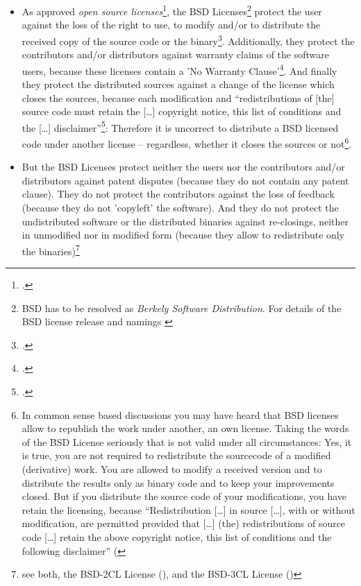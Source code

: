 \begin{itemize}
  \item As approved \emph{open source licenses}\footcite[cf.][\nopage
  wp]{OSI2012b}, the BSD Licenses\footnote{BSD has to be resolved as
  \emph{Berkely Software Distribution}. For details of the BSD license release
  and namings \cite[cf.][\nopage wp.\ editorial]{BsdLicense3Clause}} protect the
  user against the loss of the right to use, to modify and/or to distribute the
  received copy of the source code or the binary\footcite[cf.][\nopage wp
  §1ff]{OSI2012a}. Additionally, they protect the contributors and/or
  distributors against warranty claims of the software users, because these
  licenses contain a 'No Warranty Clause'\footcite[one for all version
  cf.][\nopage wp]{BsdLicense2Clause}. And finally they protect the distributed
  sources against a change of the license which closes the sources, because each
  modification and \enquote{redistributions of [the] source code must retain the
  [\ldots] copyright notice, this list of conditions and the [\ldots]
  disclaimer}\footcite[cf.][\nopage wp]{BsdLicense2Clause}: Therefore it is
  uncorrect to distribute a BSD licensed code under another license -- regardless,
  whether it closes the sources or not\footnote{In common sense based discussions
  you may have heard that BSD licenses allow to republish the work under
  another, an own license. Taking the words of the BSD License seriously that is
  not valid under all circumstances: Yes, it is true, you are not required to 
  redistribute the sourcecode of a modified (derivative) work. You are allowed 
  to modify a received version and to distribute the results only as binary code 
  and to keep your improvements closed. But if you distribute the source code of 
  your modifications, you have retain the licensing, because 
  \enquote{Redistribution [\ldots] in source [\ldots], with or without 
  modification, are permitted provided that [\ldots] (the) redistributions of 
  source code [\ldots] retain the above copyright notice, this list of 
  conditions and the following disclaimer} 
  (\cite[cf.][\nopage wp]{BsdLicense2Clause}}.
  
  \item But the BSD Licenses protect neither the users nor the contributors
  and/or distributors against patent disputes (because they do not contain any
  patent clause). They do not protect the contributors against the loss of
  feedback (because they do not 'copyleft' the software). And they do not
  protect the undistributed software or the distributed binaries against
  re-closings, neither in unmodified nor in modified form (because they allow to
  redistribute only the binaries)\footnote{see both, the BSD-2CL License
  (\cite[cf.][\nopage wp]{BsdLicense2Clause}), and the BSD-3CL License
  (\cite[cf.][\nopage wp]{BsdLicense3Clause})}
  
\end{itemize}

